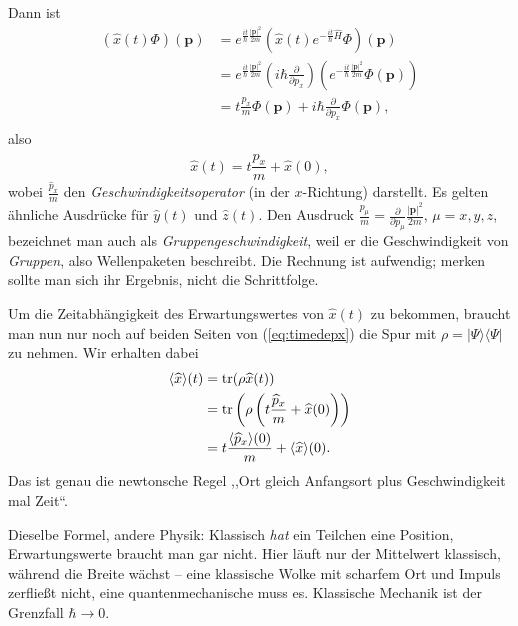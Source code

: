 Dann ist
\begin{equation}\label{eq:timedepx}
	\begin{split}
		(\widehat{x}(t)\Phi)(\mathbf{p}) &= e^{\frac{it}{\hbar} \frac{|\mathbf{p}|^2}{2m}}\left(\widehat{x}(t)e^{-\frac{it}{\hbar}\widehat{H}}\Phi\right)(\mathbf{p}) \\
		&= e^{\frac{it}{\hbar} \frac{|\mathbf{p}|^2}{2m}}\left(i\hbar \frac{\partial}{\partial p_x}\right)\left(e^{-\frac{it}{\hbar}\frac{|\mathbf{p}|^2}{2m}}\Phi(\mathbf{p})\right) \\
		&= t \frac{p_x}{m}\Phi(\mathbf{p}) + i\hbar \frac{\partial}{\partial p_x} \Phi(\mathbf{p}), \\ 
	\end{split}
\end{equation}
also
\begin{equation}
	\widehat{x}(t) = t \frac{\widehat{p}_x}{m} + \widehat{x}(0),
\end{equation}
wobei $\frac{\widehat{p}_x}{m}$ den \emph{Geschwindigkeitsoperator} (in der $x$-Richtung) darstellt. Es gelten ähnliche Ausdrücke für $\widehat{y}(t)$ und $\widehat{z}(t)$. Den Ausdruck $\frac{p_\mu}{m} = \frac{\partial}{\partial p_\mu} \frac{|\mathbf{p}|^2}{2m}$, $\mu = x,y,z$, bezeichnet man auch als \emph{Gruppengeschwindigkeit}, weil er die Geschwindigkeit von \emph{Gruppen}, also Wellenpaketen beschreibt. Die Rechnung ist aufwendig; merken sollte man sich ihr Ergebnis, nicht die Schrittfolge.

Um die Zeitabhängigkeit des Erwartungswertes von $\widehat{x}(t)$ zu bekommen, braucht man nun nur noch auf beiden Seiten von (\ref{eq:timedepx}) die Spur mit $\rho =  |\Psi\rangle\langle\Psi|$ zu nehmen. Wir erhalten dabei
\begin{equation}
	\begin{split}
		\langle\widehat{x}\rangle(t) &= \operatorname{tr}(\rho \widehat{x}(t)) \\
		&= \operatorname{tr}\left(\rho \left(t \frac{\widehat{p}_x}{m} + \widehat{x}(0)\right)\right)\\
		&= t \frac{\langle\widehat{p}_x \rangle(0)}{m} + \langle\widehat{x}\rangle(0).
	\end{split}
\end{equation}
Das ist genau die newtonsche Regel ,,Ort gleich Anfangsort plus Geschwindigkeit mal Zeit``.

\begin{intuition}
	Dieselbe Formel, andere Physik: Klassisch \emph{hat} ein Teilchen eine Position, Erwartungswerte braucht man gar nicht. Hier läuft nur der Mittelwert klassisch, während die Breite wächst -- eine klassische Wolke mit scharfem Ort und Impuls zerfließt nicht, eine quantenmechanische muss es. Klassische Mechanik ist der Grenzfall $\hbar\to 0$.
\end{intuition}

